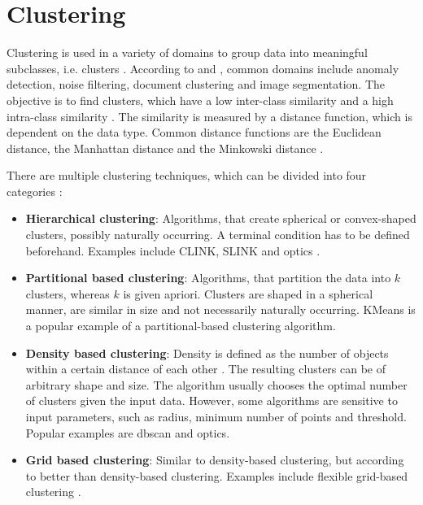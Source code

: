 
\section{Clustering}\label{sec:clustering}

Clustering is used in a variety of domains to group data into meaningful subclasses, i.e. clusters \cite{OPTICS2013, OPTICS2014, OPTICS_kMeans_2016}.
According to \citeauthor{OPTICS2013} and \citeauthor{clusteringDocs2020}, common domains include anomaly detection, noise filtering, document clustering and image segmentation. 
The objective is to find clusters, which have a low inter-class similarity and a high intra-class similarity \cite{OPTICS2013}.
The similarity is measured by a distance function, which is dependent on the data type. 
Common distance functions are the Euclidean distance, the Manhattan distance and the Minkowski distance \cite{OPTICS_kMeans_2016}.

There are multiple clustering techniques, which can be divided into four categories \cite{OPTICS2016}: 
\begin{itemize}
    \item \textbf{Hierarchical clustering}:
    Algorithms, that create spherical or convex-shaped clusters, possibly naturally occurring. 
    A terminal condition has to be defined beforehand.
    Examples include CLINK, SLINK \cite{OPTICS2014} and \ac{optics} \cite{OPTICS2013}.

    \item \textbf{Partitional based clustering}: 
    Algorithms, that partition the data into $k$ clusters, whereas $k$ is given apriori.
    Clusters are shaped in a spherical manner, are similar in size and not necessarily naturally occurring.
    KMeans is a popular example of a partitional-based clustering algorithm.

    \item \textbf{Density based clustering}:
    Density is defined as the number of objects within a certain distance of each other \cite{OPTICS_kMeans_2016}.
    The resulting clusters can be of arbitrary shape and size.
    The algorithm usually chooses the optimal number of clusters given the input data.
    However, some algorithms are sensitive to input parameters, such as radius, minimum number of points and threshold.
    Popular examples are \ac{dbscan} and \ac{optics}.
    
    \item \textbf{Grid based clustering}:
    Similar to density-based clustering, but according to \citeauthor{OPTICS2016} better than density-based clustering.
    Examples include flexible grid-based clustering \cite{OPTICS2014}.
    
\end{itemize}

